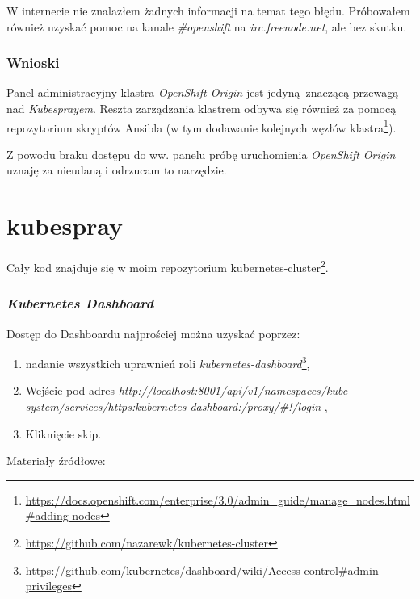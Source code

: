 \documentclass[a4paper,12pt,twoside,openany]{report}
\providecommand{\tightlist}{%
  \setlength{\itemsep}{0pt}\setlength{\parskip}{0pt}}
\DeclareRobustCommand{\href}[2]{#2\footnote{\url{#1}}}
\begin{document}
W internecie nie znalazłem żadnych informacji na temat tego błędu.
Próbowałem również uzyskać pomoc na kanale \emph{\#openshift} na
\emph{irc.freenode.net}, ale bez skutku.

\hypertarget{wnioski-3}{%
\subsubsection{Wnioski}\label{wnioski-3}}

Panel administracyjny klastra \emph{OpenShift Origin} jest
jedyną~znaczącą przewagą nad \emph{Kubesprayem}. Reszta zarządzania
klastrem odbywa się również za pomocą repozytorium skryptów Ansibla
(\href{https://docs.openshift.com/enterprise/3.0/admin_guide/manage_nodes.html\#adding-nodes}{w
tym dodawanie kolejnych węzłów klastra}).

Z powodu braku dostępu do ww. panelu próbę uruchomienia \emph{OpenShift
Origin} uznaję za nieudaną i odrzucam to narzędzie.

\hypertarget{kubespray-1}{%
\section{kubespray}\label{kubespray-1}}

Cały kod znajduje się w moim repozytorium
\href{https://github.com/nazarewk/kubernetes-cluster}{kubernetes-cluster}.

\hypertarget{kubernetes-dashboard-1}{%
\subsubsection{\texorpdfstring{\emph{Kubernetes
Dashboard}}{Kubernetes Dashboard}}\label{kubernetes-dashboard-1}}

Dostęp do Dashboardu najprościej można uzyskać poprzez:

\begin{enumerate}
\def\labelenumi{\arabic{enumi}.}
\tightlist
\item
  \href{https://github.com/kubernetes/dashboard/wiki/Access-control\#admin-privileges}{nadanie
  wszystkich uprawnień roli \emph{kubernetes-dashboard}},
\item
  Wejście pod adres
  \emph{http://localhost:8001/api/v1/namespaces/kube-system/services/https:kubernetes-dashboard:/proxy/\#!/login}
  ,
\item
  Kliknięcie skip.
\end{enumerate}

Materiały źródłowe:
\end{document}
